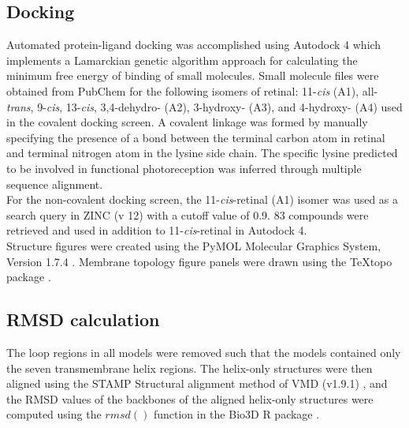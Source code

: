 \subsection*{Docking}
\indent Automated protein-ligand docking was accomplished using Autodock 4 \cite{Morris2009} which implements a Lamarckian genetic algorithm approach for calculating the minimum free energy of binding of small molecules. Small molecule files were obtained from PubChem \cite{Bolton2008} for the following isomers of retinal: 11-\textit{cis} (A1), all-\textit{trans}, 9-\textit{cis}, 13-\textit{cis}, 3,4-dehydro- (A2), 3-hydroxy- (A3), and 4-hydroxy- (A4) used in the covalent docking screen. A covalent linkage was formed by manually specifying the presence of a bond between the terminal carbon atom in retinal and terminal nitrogen atom in the lysine side chain. The specific lysine predicted to be involved in functional photoreception was inferred through multiple sequence alignment.\\
\indent For the non-covalent docking screen, the 11-\textit{cis}-retinal (A1) isomer was used as a search query in ZINC (v 12) \cite{Irwin2005} with a cutoff value of 0.9. 83 compounds were retrieved and used in addition to 11-\textit{cis}-retinal in Autodock 4.\\
\indent Structure figures were created using the PyMOL Molecular Graphics System, Version 1.7.4 \cite{PyMOL}. Membrane topology figure panels were drawn using the {\TeX}topo package \cite{Beitz2000textopo}.\\
\subsection*{RMSD calculation}
The loop regions in all models were removed such that the models contained only the seven transmembrane helix regions. The helix-only structures were then aligned using the STAMP Structural alignment method \cite{Russell1992} of VMD (v1.9.1) \cite{Humphrey1996}, and the RMSD values of the backbones of the aligned helix-only structures were computed using the $rmsd()$ function in the Bio3D R package \cite{Grant2006}.\\

